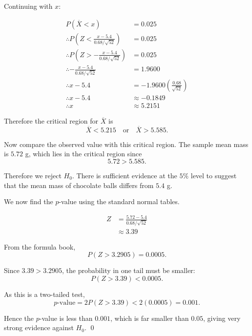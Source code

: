 \begin{solution}
    Continuing with $x$:

    \begin{align*}
        P(\overline{X}<x)&=0.025 \\
        \therefore P\!\left(Z< \frac{x - 5.4}{0.68/\sqrt{52}}\right) &= 0.025 \\
        \therefore P\!\left(Z> -\frac{x - 5.4}{0.68/\sqrt{52}}\right) &= 0.025 \\
        \therefore -\frac{x - 5.4}{0.68/\sqrt{52}} &= 1.9600 \\
        \therefore x - 5.4 &= -1.9600\left(\frac{0.68}{\sqrt{52}}\right) \\
        \therefore x - 5.4 &\approx -0.1849 \\
        \therefore x &\approx 5.2151
    \end{align*}

    Therefore the critical region for $\overline{X}$ is
    \[
    \overline{X}<5.215 \quad \text{or} \quad \overline{X}>5.585.
    \]

    Now compare the observed value with this critical region.  
    The sample mean mass is $5.72$ g, which lies in the critical region since
    \[
    5.72>5.585.
    \]

    Therefore we reject $H_0$.  
    There is sufficient evidence at the $5\%$ level to suggest that the mean mass of chocolate balls differs from $5.4$ g.

    We now find the $p$-value using the standard normal tables.

    \begin{align*}
    Z &= \frac{5.72-5.4}{0.68/\sqrt{52}} \\
    &\approx 3.39
    \end{align*}

    From the formula book,
    \[
    P(Z>3.2905)=0.0005.
    \]

    Since $3.39>3.2905$, the probability in one tail must be smaller:
    \[
    P(Z>3.39)<0.0005.
    \]

    As this is a two-tailed test,
    \[
    p\text{-value} = 2P(Z>3.39) < 2(0.0005)=0.001.
    \]

    Hence the $p$-value is less than $0.001$, which is far smaller than $0.05$, giving very strong evidence against $H_0$.
    \qed

\end{solution}

